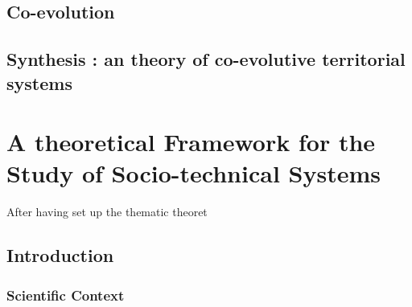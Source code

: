\subsection{Co-evolution}









\subsection{Synthesis : an theory of co-evolutive territorial systems}







\newpage

\section{A theoretical Framework for the Study of Socio-technical Systems}

After having set up the thematic theoret


\subsection*{Introduction}

\subsubsection*{Scientific Context}



